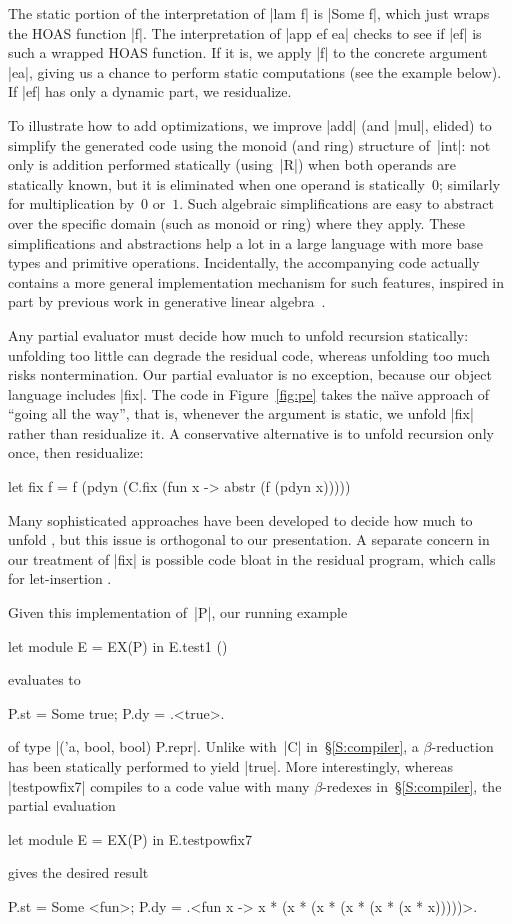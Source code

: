 The static portion of the interpretation of |lam f| is |Some f|, 
which just wraps the HOAS
function |f|. The interpretation of |app ef ea| 
checks to see if |ef| is such a wrapped
HOAS function. If it is, we apply |f| to the
concrete argument |ea|, giving us a chance to perform static
computations (see the example below). If
|ef| has only a dynamic part, we residualize.

To illustrate how to add optimizations, we improve |add| (and |mul|,
elided) to simplify the generated code using the monoid (and ring)
structure of~|int|: not only is addition performed statically
(using~|R|) when both operands are statically known, but it is
eliminated when one operand is statically~$0$; similarly for
multiplication by~$0$ or~$1$.  
Such algebraic simplifications are easy
to abstract over the specific domain (such as monoid or ring) where they
apply.  These simplifications and abstractions help a lot
in a large language with more base types and primitive operations.
Incidentally, the accompanying code actually contains a more general
implementation mechanism for such features, inspired in part by previous work
in generative linear algebra~\citep{CaretteKiselyov05}.

Any partial evaluator must decide how much to unfold recursion
statically: unfolding too little can degrade the residual code, whereas
unfolding too much risks nontermination.  Our partial evaluator is no
exception, because our object language includes |fix|.  The code in
Figure~\ref{fig:pe} takes the na\"\i ve approach of ``going all the
way'', that is, whenever the 
argument is static, we unfold |fix| rather than residualize it.
A conservative alternative is to unfold recursion only once, then residualize:
\begin{code}
let fix f = f (pdyn (C.fix (fun x -> abstr (f (pdyn x)))))
\end{code}
Many sophisticated approaches have been developed to decide how much to unfold
\citep{Jones-Mix,jones-partial}, but this issue is 
orthogonal to our presentation.
A separate concern in our treatment of |fix| is possible code bloat in
the residual program, which calls for let-insertion
\citep{BondorfDanvy,SwadiTahaKiselyovPasalic2006}.


Given this implementation of~|P|, our running example
\begin{code}
let module E = EX(P) in E.test1 ()
\end{code}
evaluates to
\begin{code}
{P.st = Some true; P.dy = .<true>.}
\end{code}
of type |('a, bool, bool) P.repr|.  Unlike with~|C| in~\S\ref{S:compiler},
a $\beta$-reduction has been statically performed to yield |true|.  More
interestingly, whereas |testpowfix7| compiles to a code value with many
$\beta$-redexes in~\S\ref{S:compiler}, the partial evaluation
\begin{code}
let module E = EX(P) in E.testpowfix7
\end{code}
gives the desired result
\begin{code}
{P.st = Some <fun>;
 P.dy = .<fun x -> x * (x * (x * (x * (x * (x * x)))))>.}
\end{code}

